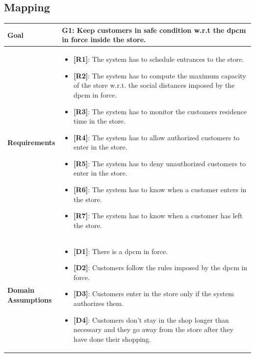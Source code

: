 \subsection{Mapping}

\begin{table}[H]
\centering
\begin{tabular}{| m{} | m{} |} 
	\hline
	\textbf{Goal} &
		\textbf{G1: Keep customers in safe condition w.r.t the \gls{dpcm} in force inside the store.} \\
	\hline
	\textbf{Requirements} &
		\begin{itemize}
			\item {\textbf{[R1]}}: The system has to schedule entrances to the store.
			\item {\textbf{[R2]}}: The system has to compute the maximum capacity of the store w.r.t. the social distances imposed by the \gls{dpcm} in force.
			\item {\textbf{[R3]}}: The system has to monitor the customers residence time in the store.
			\item {\textbf{[R4]}}: The system has to allow authorized customers to enter in the store.
			\item {\textbf{[R5]}}: The system has to deny unauthorized customers to enter in the store.
			\item {\textbf{[R6]}}: The system has to know when a customer enters in the store.
			\item {\textbf{[R7]}}: The system has to know when a customer has left the store.
		\end{itemize} \\
	\hline
	\shortstack[l]{\textbf{Domain} \\ \textbf{Assumptions}} & 
		\begin{itemize}
			\item {\textbf{[D1]}}: There is a \gls{dpcm} in force.
			\item {\textbf{[D2]}}: Customers follow the rules imposed by the \gls{dpcm} in force.
			\item {\textbf{[D3]}}: Customers enter in the store only if the system authorizes them.
			\item {\textbf{[D4]}}: Customers don't stay in the shop longer than necessary and they go away from the store after they have done their shopping.
		\end{itemize} \\ 
	\hline
\end{tabular}
\end{table}

